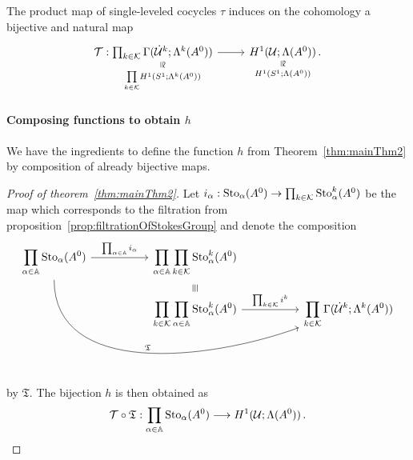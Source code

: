 \begin{cor}
  The product map of single-leveled cocycles $\tau$ induces on the cohomology
  a bijective and natural map
  \[ \begin{tikzcd}
    \cT:
    \underset{\underset{k\in\cK}\prod H^1(S^1;\Lambda^k(A^0))}{%
      \underset{\text{\rotatebox[origin=c]{-90}{$\cong$}}}{%
        \prod_{k\in\cK}\Gamma(\dot\cU^k;\Lambda^k(A^0))}}
    \rar&
    \underset{H^1(S^1;\Lambda(A^0))}{%
      \underset{\text{\rotatebox[origin=c]{-90}{$\cong$}}}{%
        H^1(\cU;\Lambda(A^0))}}\,.
  \end{tikzcd} \]
\end{cor}
\paragraph{Composing functions to obtain $h$}
We have the ingredients to define the function $h$ from
Theorem~\ref{thm:mainThm2} by composition of already bijective maps.
\begin{proof}[Proof of theorem~\ref{thm:mainThm2}]
  Let $i_\alpha:\operatorname{Sto}_\alpha(A^0)\to\prod_{k\in\mathcal{K}}\operatorname{Sto}_\alpha^k(A^0)$ be the
  map which corresponds to the filtration from
  proposition~\ref{prop:filtrationOfStokesGroup} and
  denote the composition
  \[ \begin{tikzcd}[column sep=1.8cm,row sep=0]
      \displaystyle \prod_{\alpha\in\A}\Sto_\alpha(A^0)
      \rar{\prod_{\alpha\in\A}i_\alpha}
      \arrow[ddrr, out=270,in=200,"\mathfrak{T}"]
      &
      \displaystyle \prod_{\alpha\in\A}\prod_{k\in\cK}\Sto_\alpha^k(A^0)
    \\&\text{\rotatebox[origin=c]{-90}{$\equiv$}}
    \\&\displaystyle \prod_{k\in\cK}\prod_{\alpha\in\A}\Sto_\alpha^k(A^0)
      \rar{\prod_{k\in\cK}i^k}&
      \displaystyle \prod_{k\in\cK}\Gamma(\dot\cU^k;\Lambda^k(A^0))
  \end{tikzcd} \]
  by $\mathfrak{T}$. The bijection $h$ is then obtained as
  \[
    \mathcal{T}\circ\mathfrak{T}: \prod_{\alpha\in\mathbb{A}}\operatorname{Sto}_\alpha(A^0)
    \longrightarrow H^1(\mathcal{U};\Lambda(A^0)) \,.
  \]
\end{proof}

